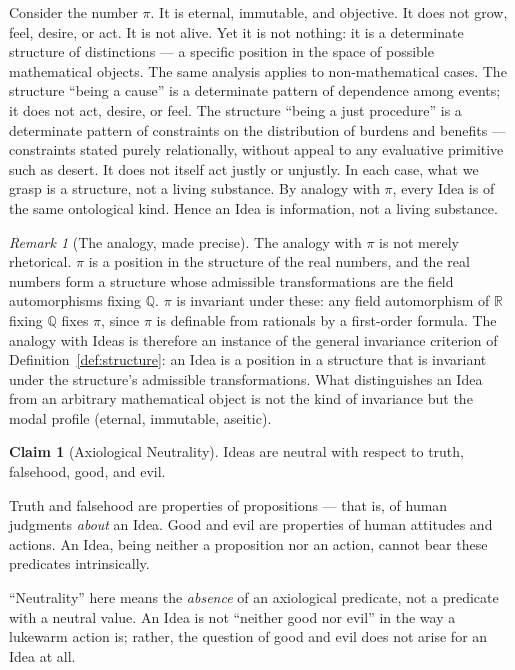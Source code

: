 \documentclass[11pt,a4paper]{article}
\theoremstyle{definition}
\newtheorem{claim}{Claim}[section]
\theoremstyle{remark}
\newtheorem{remark}{Remark}[section]
\begin{document}
Consider the number $\pi$. It is eternal, immutable, and objective. It
does not grow, feel, desire, or act. It is not alive. Yet it is not
nothing: it is a determinate structure of distinctions --- a specific
position in the space of possible mathematical objects. The same
analysis applies to non-mathematical cases. The structure ``being a
cause'' is a determinate pattern of dependence among events; it does
not act, desire, or feel. The structure ``being a just procedure'' is
a determinate pattern of constraints on the distribution of burdens
and benefits --- constraints stated purely relationally, without appeal
to any evaluative primitive such as desert. It does not itself act
justly or unjustly. In each case, what we grasp is a structure, not a
living substance. By analogy with $\pi$, every Idea is of the same
ontological kind. Hence an Idea is information, not a living
substance.

\begin{remark}[The analogy, made precise]
The analogy with $\pi$ is not merely rhetorical. $\pi$ is a position
in the structure of the real numbers, and the real numbers form a
structure whose admissible transformations are the field automorphisms
fixing $\mathbb{Q}$. $\pi$ is invariant under these: any field
automorphism of $\mathbb{R}$ fixing $\mathbb{Q}$ fixes $\pi$, since
$\pi$ is definable from rationals by a first-order formula. The
analogy with Ideas is therefore an instance of the general
invariance criterion of Definition~\ref{def:structure}: an Idea is a
position in a structure that is invariant under the structure's
admissible transformations. What distinguishes an Idea from an
arbitrary mathematical object is not the kind of invariance but the
modal profile (eternal, immutable, aseitic).
\end{remark}

\begin{claim}[Axiological Neutrality]
Ideas are neutral with respect to truth, falsehood, good, and evil.
\end{claim}

Truth and falsehood are properties of propositions --- that is, of
human judgments \emph{about} an Idea. Good and evil are properties of
human attitudes and actions. An Idea, being neither a proposition nor
an action, cannot bear these predicates intrinsically.

``Neutrality'' here means the \emph{absence} of an axiological
predicate, not a predicate with a neutral value. An Idea is not
``neither good nor evil'' in the way a lukewarm action is; rather, the
question of good and evil does not arise for an Idea at all.
\end{document}
